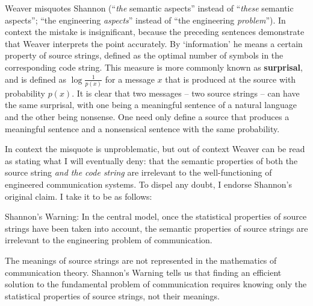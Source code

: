 \documentclass[12pt]{article}
\begin{document}
\noindent Weaver misquotes Shannon (``\emph{the} semantic aspects'' instead of ``\emph{these} semantic aspects''; ``the engineering \textit{aspects}'' instead of ``the engineering \textit{problem}'').
In context the mistake is insignificant, because the preceding sentences demonstrate that Weaver interprets the point accurately.
By `information' he means a certain property of source strings, defined as the optimal number of symbols in the corresponding code string.
This measure is more commonly known as \textbf{surprisal}, and is defined as $\log{\frac{1}{p(x)}}$ for a message $x$ that is produced at the source with probability $p(x)$.
It is clear that two messages -- two source strings -- can have the same surprisal, with one being a meaningful sentence of a natural language and the other being nonsense.
One need only define a source that produces a meaningful sentence and a nonsensical sentence with the same probability.

In context the misquote is unproblematic, but out of context Weaver can be read as stating what I will eventually deny: that the semantic properties of both the source string \textit{and the code string} are irrelevant to the well-functioning of engineered communication systems.
To dispel any doubt, I endorse Shannon's original claim.
I take it to be as follows:

\begin{myquote}
{\sc Shannon's Warning}: In the central model, once the statistical properties of source strings have been taken into account, the semantic properties of source strings are irrelevant to the engineering problem of communication.
\end{myquote}

\noindent The meanings of source strings are not represented in the mathematics of communication theory.
{\sc Shannon's Warning} tells us that finding an efficient solution to the fundamental problem of communication requires knowing only the statistical properties of source strings, not their meanings.

\end{document}
